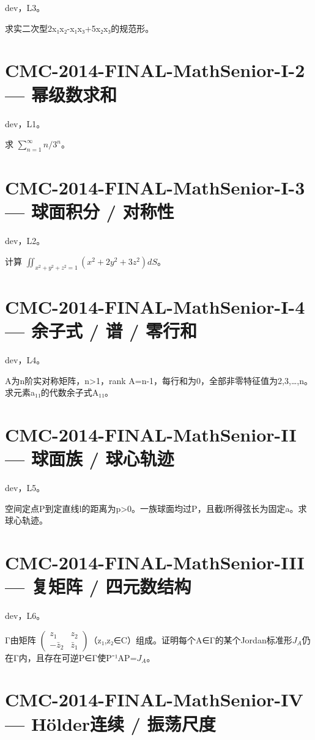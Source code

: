 \documentclass[UTF8]{ctexart}
\begin{document}
dev，L3。

求实二次型2x₁x₂-x₁x₃+5x₂x₃的规范形。

\section*{CMC-2014-FINAL-MathSenior-I-2 — 幂级数求和}

dev，L1。

求 $\sum_{n=1}^\infty n/3^n$。

\section*{CMC-2014-FINAL-MathSenior-I-3 — 球面积分 / 对称性}

dev，L2。

计算 $\iint_{x^2+y^2+z^2=1}(x^2+2y^2+3z^2)dS$。

\section*{CMC-2014-FINAL-MathSenior-I-4 — 余子式 / 谱 / 零行和}

dev，L4。

A为n阶实对称矩阵，n>1，rank A=n-1，每行和为0，全部非零特征值为2,3,…,n。求元素a₁₁的代数余子式A₁₁。

\section*{CMC-2014-FINAL-MathSenior-II — 球面族 / 球心轨迹}

dev，L5。

空间定点P到定直线l的距离为p>0。一族球面均过P，且截l所得弦长为固定a。求球心轨迹。

\section*{CMC-2014-FINAL-MathSenior-III — 复矩阵 / 四元数结构}

dev，L6。

Γ由矩阵 $\begin{pmatrix}z_1&z_2\\-\bar z_2&\bar z_1\end{pmatrix}$（z₁,z₂∈C）组成。证明每个A∈Γ的某个Jordan标准形$J_A$仍在Γ内，且存在可逆P∈Γ使P⁻¹AP=$J_A$。

\section*{CMC-2014-FINAL-MathSenior-IV — Hölder连续 / 振荡尺度}
\end{document}
